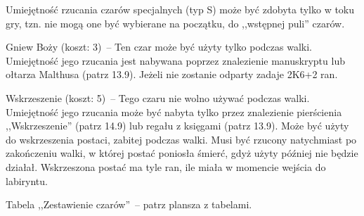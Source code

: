 Umiejętność rzucania czarów specjalnych (typ S) może być zdobyta tylko w toku gry, tzn. nie mogą one być wybierane na początku, do ,,wstępnej puli'' czarów.

Gniew Boży (koszt: 3)~-- Ten czar może być użyty tylko podczas walki.
Umiejętność jego rzucania jest nabywana poprzez znalezienie manuskryptu lub ołtarza Malthusa (patrz 13.9).
Jeżeli nie zostanie odparty zadaje 2K6+2 ran.

Wskrzeszenie (koszt: 5)~-- Tego czaru nie wolno używać podczas walki.
Umiejętność jego rzucania może być nabyta tylko przez znalezienie pierścienia ,,Wskrzeszenie'' (patrz 14.9) lub regału z księgami (patrz 13.9).
Może być użyty do wskrzeszenia postaci, zabitej podczas walki.
Musi być rzucony natychmiast po zakończeniu walki, w której postać poniosła śmierć, gdyż użyty później nie będzie działał.
Wskrzeszona postać ma tyle ran, ile miała w momencie wejścia do labiryntu.

Tabela ,,Zestawienie czarów''~-- patrz plansza z tabelami.
